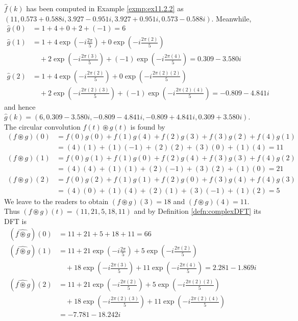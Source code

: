 \begin{solution}
$\hat{f}(k)$ has been computed in Example \ref{exmp:ex11.2.2} as $(11, 0.573+0.588i, \allowbreak 3.927-0.951i, 3.927+0.951i, 0.573-0.588i)$. Meanwhile,
\begin{align*}
\hat{g}(0) &= 1+4+0+2+(-1) = 6 \\
\hat{g}(1) &= 1 + 4\exp(-i\frac{2\pi}{5}) + 0\exp(-i\frac{2\pi(2)}{5}) \\
&\quad + 2\exp(-i\frac{2\pi(3)}{5}) + (-1)\exp(-i\frac{2\pi(4)}{5}) = 0.309-3.580i \\
\hat{g}(2) &= 1 + 4\exp(-i\frac{2\pi(2)}{5}) + 0\exp(-i\frac{2\pi(2)(2)}{5}) \\
&\quad+ 2\exp(-i\frac{2\pi(2)(3)}{5}) + (-1)\exp(-i\frac{2\pi(2)(4)}{5}) = -0.809 - 4.841i
\end{align*}
and hence $\hat{g}(k) = (6, 0.309-3.580i, -0.809-4.841i, -0.809+4.841i, \allowbreak 0.309+3.580i)$. The circular convolution $f(t) \circledast g(t)$ is found by
\begin{align*}
(f \circledast g)(0) &= f(0)g(0) + f(1)g(4) + f(2)g(3) + f(3)g(2) + f(4)g(1) \\
&= (4)(1) + (1)(-1) + (2)(2) + (3)(0) + (1)(4) = 11 \\
(f \circledast g)(1) &= f(0)g(1) + f(1)g(0) + f(2)g(4) + f(3)g(3) + f(4)g(2) \\
&= (4)(4) + (1)(1) + (2)(-1) + (3)(2) + (1)(0) = 21 \\
(f \circledast g)(2) &= f(0)g(2) + f(1)g(1) + f(2)g(0) + f(3)g(4) + f(4)g(3) \\
&= (4)(0) + (1)(4) + (2)(1) + (3)(-1) + (1)(2) = 5
\end{align*}
We leave to the readers to obtain $(f \circledast g)(3) = 18$ and $(f \circledast g)(4) = 11$. Thus $(f \circledast g)(t) = (11, 21, 5, 18, 11)$ and by Definition \ref{defn:complexDFT} its DFT is
\begin{align*}
(\widehat{f \circledast g})(0) &= 11+21+5+18+11 = 66 \\
(\widehat{f \circledast g})(1) &= 11 + 21\exp(-i\frac{2\pi}{5}) + 5\exp(-i\frac{2\pi(2)}{5}) \\
&\quad + 18\exp(-i\frac{2\pi(3)}{5}) + 11\exp(-i\frac{2\pi(4)}{5}) = 2.281 - 1.869i \\
(\widehat{f \circledast g})(2) &= 11 + 21\exp(-i\frac{2\pi(2)}{5}) + 5\exp(-i\frac{2\pi(2)(2)}{5}) \\
&\quad+ 18\exp(-i\frac{2\pi(2)(3)}{5}) + 11\exp(-i\frac{2\pi(2)(4)}{5}) \\
&= -7.781 - 18.242i
\end{align*}

\end{solution}
